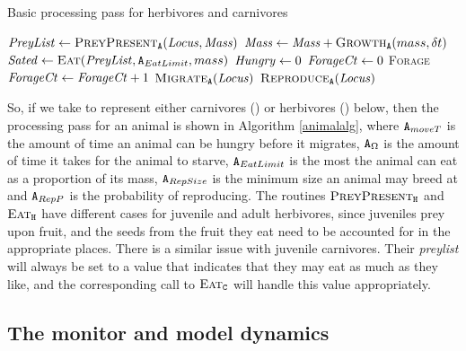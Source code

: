 \begin{algorithm}
  \caption{Basic processing pass for herbivores and carnivores}
  \label{animalalg}
  \begin{algorithmic}
  \State \Die
  \EndIf
  \State $\mathit{PreyList} \gets \text{\textsc{PreyPresent}}_{\mathtt{A}}(\mathit{Locus},\mathit{Mass})$
  \State $\mathit{Mass} \gets \mathit{Mass} + \text{\textsc{Growth}}_{\mathtt{A}}(mass, \delta t)$
  \State $\mathit{Sated} \gets \text{\textsc{Eat}}(\mathit{PreyList}, \texttt{A}_{EatLimit}, mass)$
  \State $\mathit{Hungry} \gets 0$
  \State $\mathit{ForageCt} \gets 0$
  \State \textsc{Forage}
  \State $\mathit{ForageCt} \gets \mathit{ForageCt} + 1$
  \State $\text{\textsc{Migrate}}_{\mathtt{A}}(\mathit{Locus})$
  \Else
  $\text{\textsc{Reproduce}}_{\mathtt{A}}(\mathit{Locus})$
  \EndIf
  \EndIf
\end{algorithmic}
\end{algorithm}

So, if we take  to represent either carnivores () or
herbivores () below, then the processing pass for an animal is
shown in Algorithm \ref{animalalg}, where $\texttt{A}_{moveT}$ is the
amount of time an animal can be hungry before it migrates,
$\texttt{A}_\Omega$ is the amount of time it takes for the animal to
starve, $\texttt{A}_{EatLimit}$ is the most the animal can eat as a
proportion of its mass, $\texttt{A}_{RepSize}$ is the minimum size an
animal may breed at and $\texttt{A}_{RepP}$ is the probability of
reproducing. The routines $\text{\textsc{PreyPresent}}_{\mathtt{H}}$ and
$\text{\textsc{Eat}}_{\mathtt{H}}$ have different cases for juvenile and adult
herbivores, since juveniles prey upon fruit, and the seeds from the
fruit they eat need to be accounted for in the appropriate places. There is
a similar issue with juvenile carnivores. Their \emph{preylist} will
always be set to a value that indicates that they may eat as much as
they like, and the corresponding call to $\text{\textsc{Eat}}_{\mathtt{C}}$ will
handle this value appropriately.


\subsection{The monitor and model dynamics}
\newcommand{\cst}[1]{\node{\check{\tau}}^\Sigma_{#1}} %
\newcommand{\domt}[1]{\node{\check{\tau}}^\Sigma_{#1}} %



